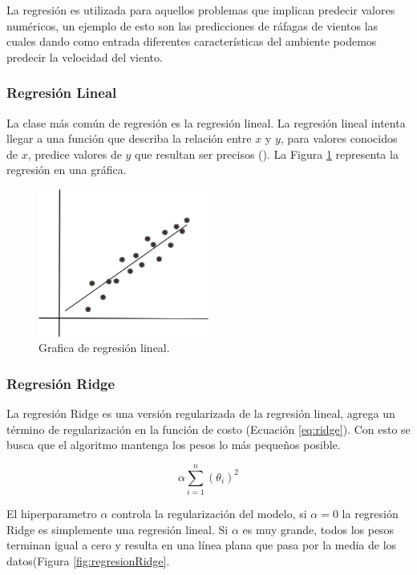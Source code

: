 La regresión es utilizada para aquellos problemas que implican predecir valores numéricos, un ejemplo de esto son las predicciones de ráfagas de vientos las cuales dando como entrada diferentes características del ambiente podemos predecir la velocidad del viento.

\subsubsection{Regresión Lineal}

La clase más común de regresión es la regresión lineal. La regresión lineal intenta llegar a una función que describa la relación entre $x$ y $y$, para valores conocidos de $x$, predice valores de $y$ que resultan ser precisos (\cite{patterson2017deep}). La Figura \ref{fig:regresionLineal} representa la regresión en una gráfica.

\begin{figure}[H]
    \centering
    \includegraphics[width=0.5\textwidth]{MarcoTeorico/imgs/RegresionLineal.png}
    \caption{Grafica de regresión lineal.}
    \label{fig:regresionLineal}
\end{figure}

\subsubsection{Regresión Ridge}

La regresión Ridge es una versión regularizada de la regresión lineal, agrega un término de regularización en la función de costo (Ecuación \ref{eq:ridge}). Con esto se busca que el algoritmo mantenga los pesos lo más pequeños posible.

\begin{equation}
    \label{eq:ridge}
    \alpha \displaystyle\sum\limits_{i=1}^n (\theta_i)^{2}
\end{equation}

El hiperparametro $\alpha$ controla la regularización del modelo, si $\alpha = 0$ la regresión Ridge es simplemente una regresión lineal. Si $\alpha$ es muy grande, todos los pesos terminan igual a cero y resulta en una línea plana que pasa por la media de los datos(Figura \ref{fig:regresionRidge}.

